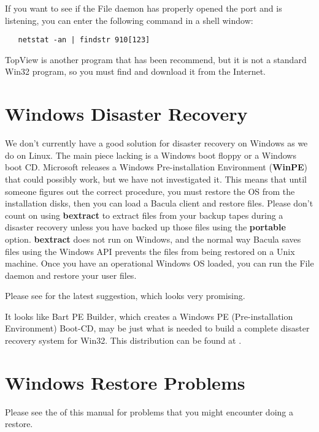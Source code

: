 If you want to see if the File daemon has properly opened the port and is
listening, you can enter the following command in a shell window: 

\footnotesize
\begin{verbatim}
   netstat -an | findstr 910[123]
\end{verbatim}
\normalsize

TopView is another program that has been recommend, but it is not a
standard Win32 program, so you must find and download it from the Internet.

\section{Windows Disaster Recovery}

We don't currently have a good solution for disaster recovery on Windows as we
do on Linux. The main piece lacking is a Windows boot floppy or a Windows boot
CD. Microsoft releases a Windows Pre-installation Environment ({\bf WinPE})
that could possibly work, but we have not investigated it. This means that
until someone figures out the correct procedure, you must restore the OS from
the installation disks, then you can load a Bacula client and restore files.
Please don't count on using {\bf bextract} to extract files from your backup
tapes during a disaster recovery unless you have backed up those files using
the {\bf portable} option. {\bf bextract} does not run on Windows, and the
normal way Bacula saves files using the Windows API prevents the files from
being restored on a Unix machine. Once you have an operational Windows OS
loaded, you can run the File daemon and restore your user files. 

Please see 
 for the latest
suggestion, which looks very promising. 

It looks like Bart PE Builder, which creates a Windows PE (Pre-installation
Environment) Boot-CD, may be just what is needed to build a complete disaster
recovery system for Win32. This distribution can be found at 
.

\section{Windows Restore Problems}
Please see the  
 of this manual for problems
that you might encounter doing a restore.

